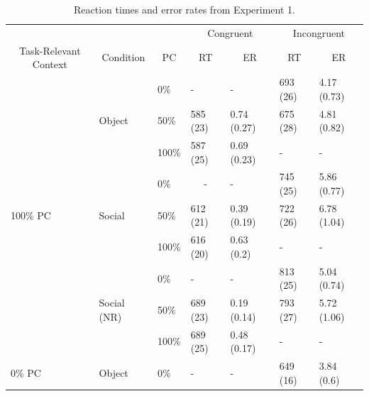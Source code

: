 \documentclass[english,,man,floatsintext]{apa6}
\begin{document}
\begin{table}[htbp]
\caption{Reaction times and error rates from Experiment 1.}
\label{TR_table}
\centering
\begin{tabular}{lllcccc}
\toprule
 & & & \multicolumn{2}{c}{Congruent} & \multicolumn{2}{c}{Incongruent} \\
\cmidrule(rl){4-5}
\cmidrule(rl){6-7}
\multicolumn{1}{c}{Task-Relevant Context} & \multicolumn{1}{c}{Condition} & \multicolumn{1}{c}{PC} & \multicolumn{1}{c}{RT} & \multicolumn{1}{c}{ER} & \multicolumn{1}{c}{RT} & \multicolumn{1}{c}{ER}  \\
\midrule
\multirow{9}{*}{100\% PC} & \multirow{3}{*}{Object} & \multicolumn{1}{l}{0\%} & \multicolumn{1}{l}{-} & \multicolumn{1}{l}{-} & \multicolumn{1}{l}{693 (26)} & \multicolumn{1}{l}{4.17 (0.73)} \\
& & \multicolumn{1}{l}{50\%} & \multicolumn{1}{l}{585 (23)} & \multicolumn{1}{l}{0.74 (0.27)} & \multicolumn{1}{l}{675 (28)} & \multicolumn{1}{l}{4.81 (0.82)} \\
& & \multicolumn{1}{l}{100\%} & \multicolumn{1}{l}{587 (25)} & \multicolumn{1}{l}{0.69 (0.23)} & \multicolumn{1}{l}{-} & \multicolumn{1}{l}{-} \\
\cmidrule(rl){2-7}
& \multirow{3}{*}{Social} & \multicolumn{1}{l}{0\%} & \multicolumn{1}{c}{-} & \multicolumn{1}{l}{-} & \multicolumn{1}{l}{745 (25)} & \multicolumn{1}{l}{5.86 (0.77)} \\
& & \multicolumn{1}{l}{50\%} & \multicolumn{1}{l}{612 (21)} & \multicolumn{1}{l}{0.39 (0.19)} & \multicolumn{1}{l}{722 (26)} & \multicolumn{1}{l}{6.78 (1.04)} \\
& & \multicolumn{1}{l}{100\%} & \multicolumn{1}{l}{616 (20)} & \multicolumn{1}{l}{0.63 (0.2)} & \multicolumn{1}{l}{-} & \multicolumn{1}{l}{-} \\
\cmidrule(rl){2-7}
& \multirow{3}{*}{Social (NR)} & \multicolumn{1}{l}{0\%} & \multicolumn{1}{l}{-} & \multicolumn{1}{l}{-} & \multicolumn{1}{l}{813 (25)} & \multicolumn{1}{l}{5.04 (0.74)} \\
& & \multicolumn{1}{l}{50\%} & \multicolumn{1}{l}{689 (23)} & \multicolumn{1}{l}{0.19 (0.14)} & \multicolumn{1}{l}{793 (27)} & \multicolumn{1}{l}{5.72 (1.06)} \\
& & \multicolumn{1}{l}{100\%} & \multicolumn{1}{l}{689 (25)} & \multicolumn{1}{l}{0.48 (0.17)} & \multicolumn{1}{l}{-} & \multicolumn{1}{l}{-} \\
\midrule
\multirow{9}{*}{0\% PC} & \multirow{3}{*}{Object} & \multicolumn{1}{l}{0\%} & \multicolumn{1}{l}{-} & \multicolumn{1}{l}{-} & \multicolumn{1}{l}{649 (16)} & \multicolumn{1}{l}{3.84 (0.6)} \\

\end{tabular}
\end{table}
\end{document}
